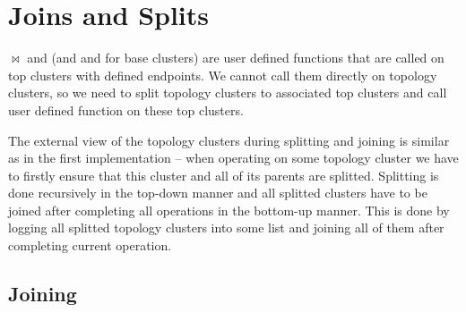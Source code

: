 \section{Joins and Splits}

$\Join$ and \Split{} (and \Create{} and \Destroy{} for base clusters) are user
defined functions that are called on top clusters with defined endpoints. We
cannot call them directly on topology clusters, so we need to split topology
clusters to associated top clusters and call user defined function on these top
clusters.

The external view of the topology clusters during splitting and joining is
similar as in the first implementation -- when operating on some topology
cluster we have to firstly ensure that this cluster and all of its parents are
splitted. Splitting is done recursively in the top-down manner and all splitted
clusters have to be joined after completing all operations in the bottom-up
manner. This is done by logging all splitted topology clusters into some list
and joining all of them after completing current operation.

\subsection{Joining}


